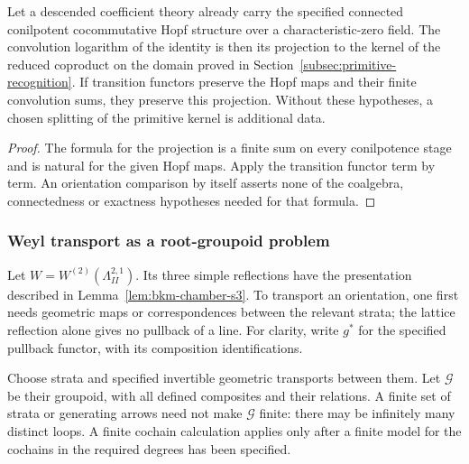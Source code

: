 \begin{proposition}
\label{prop:orientation-descent-primitive-projection}
Let a descended coefficient theory already carry the specified
connected conilpotent cocommutative Hopf structure over a
characteristic-zero field.  The convolution logarithm of the identity
is then its projection to the kernel of the reduced coproduct on
the domain proved in
Section~\ref{subsec:primitive-recognition}.  If transition functors
preserve the Hopf maps and their finite convolution sums, they
preserve this projection.  Without these hypotheses, a chosen
splitting of the primitive kernel is additional data.
\end{proposition}
\begin{proof}
The formula for the projection is a finite sum on every conilpotence
stage and is natural for the given Hopf maps.  Apply the transition
functor term by term.  An orientation comparison by itself asserts
none of the coalgebra, connectedness or exactness hypotheses needed
for that formula.
\end{proof}

\subsubsection*{Weyl transport as a root-groupoid problem}

Let \(W=W^{(2)}(\Lambda_{II}^{2,1})\).  Its three simple
reflections have the presentation described in
Lemma~\ref{lem:bkm-chamber-s3}.  To transport an orientation, one
first needs geometric maps or correspondences between the relevant
strata; the lattice reflection alone gives no pullback of a line.
For clarity, write \(g^*\) for the specified pullback functor, with
its composition identifications.

\begin{definition}
\label{def:finite-partial-action-groupoid-GR}
Choose strata and specified invertible geometric transports between
them.  Let \(\mathcal G\) be their groupoid, with all defined
composites and their relations.  A finite set of strata or generating
arrows need not make \(\mathcal G\) finite: there may be infinitely
many distinct loops.  A finite cochain calculation applies only after
a finite model for the cochains in the required degrees has been
specified.
\end{definition}

